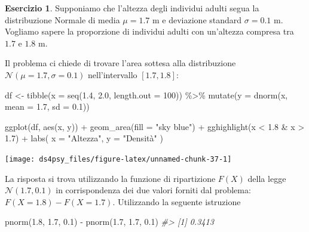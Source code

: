 \documentclass[
  11pt,
]{krantz}
\makeatletter
\newenvironment{Shaded}{\begin{snugshade}}{\end{snugshade}}
\newcommand{\AttributeTok}[1]{\textcolor[rgb]{0.61,0.61,0.61}{#1}}
\newcommand{\CommentTok}[1]{\textcolor[rgb]{0.37,0.37,0.37}{\textit{#1}}}
\newcommand{\DecValTok}[1]{\textcolor[rgb]{0.06,0.06,0.06}{#1}}
\newcommand{\FloatTok}[1]{\textcolor[rgb]{0.06,0.06,0.06}{#1}}
\newcommand{\FunctionTok}[1]{\textcolor[rgb]{0,0,0}{#1}}
\newcommand{\NormalTok}[1]{#1}
\newcommand{\OtherTok}[1]{\textcolor[rgb]{0.37,0.37,0.37}{#1}}
\newcommand{\SpecialCharTok}[1]{\textcolor[rgb]{0,0,0}{#1}}
\newcommand{\StringTok}[1]{\textcolor[rgb]{0.5,0.5,0.5}{#1}}
\newenvironment{kframe}{%
\medskip{}
\setlength{\fboxsep}{.8em}
 \def\at@end@of@kframe{}%
 \ifinner\ifhmode%
  \def\at@end@of@kframe{\end{minipage}}%
  \begin{minipage}{\columnwidth}%
 \fi\fi%
 \def\FrameCommand##1{\hskip\@totalleftmargin \hskip-\fboxsep
 \colorbox{shadecolor}{##1}\hskip-\fboxsep
     \hskip-\linewidth \hskip-\@totalleftmargin \hskip\columnwidth}%
 \MakeFramed {\advance\hsize-\width
   \@totalleftmargin\z@ \linewidth\hsize
   \@setminipage}}%
 {\par\unskip\endMakeFramed%
 \at@end@of@kframe}
\renewenvironment{Shaded}{\begin{kframe}}{\end{kframe}}
\theoremstyle{definition}
\theoremstyle{definition}
\theoremstyle{definition}
\newtheorem{exercise}{Esercizio}[chapter]
\theoremstyle{definition}
\theoremstyle{remark}
\makeatother
\begin{document}
\begin{exercise}
Supponiamo che l'altezza degli individui adulti segua la distribuzione Normale di media \(\mu = 1.7\) m e deviazione standard \(\sigma = 0.1\) m. Vogliamo sapere la proporzione di individui adulti con un'altezza compresa tra \(1.7\) e \(1.8\) m.

Il problema ci chiede di trovare l'area sottesa alla distribuzione \(\mathcal{N}(\mu = 1.7, \sigma = 0.1)\) nell'intervallo \([1.7, 1.8]\):

\begin{Shaded}
\begin{Highlighting}[]
\NormalTok{df }\OtherTok{\textless{}{-}} \FunctionTok{tibble}\NormalTok{(}\AttributeTok{x =} \FunctionTok{seq}\NormalTok{(}\FloatTok{1.4}\NormalTok{, }\FloatTok{2.0}\NormalTok{, }\AttributeTok{length.out =} \DecValTok{100}\NormalTok{)) }\SpecialCharTok{\%\textgreater{}\%}
  \FunctionTok{mutate}\NormalTok{(}\AttributeTok{y =} \FunctionTok{dnorm}\NormalTok{(x, }\AttributeTok{mean =} \FloatTok{1.7}\NormalTok{, }\AttributeTok{sd =} \FloatTok{0.1}\NormalTok{))}

\FunctionTok{ggplot}\NormalTok{(df, }\FunctionTok{aes}\NormalTok{(x, y)) }\SpecialCharTok{+}
  \FunctionTok{geom\_area}\NormalTok{(}\AttributeTok{fill =} \StringTok{"sky blue"}\NormalTok{) }\SpecialCharTok{+}
  \FunctionTok{gghighlight}\NormalTok{(x }\SpecialCharTok{\textless{}} \FloatTok{1.8} \SpecialCharTok{\&}\NormalTok{ x }\SpecialCharTok{\textgreater{}} \FloatTok{1.7}\NormalTok{) }\SpecialCharTok{+}
  \FunctionTok{labs}\NormalTok{(}
    \AttributeTok{x =} \StringTok{"Altezza"}\NormalTok{,}
    \AttributeTok{y =} \StringTok{"Densità"}
\NormalTok{  )}
\end{Highlighting}
\end{Shaded}

\begin{center}\texttt{[image: ds4psy\_files/figure-latex/unnamed-chunk-37-1]} \end{center}

\noindent La risposta si trova utilizzando la funzione di ripartizione \(F(X)\) della legge \(\mathcal{N}(1.7, 0.1)\) in corrispondenza dei due valori forniti dal problema: \(F(X = 1.8) - F(X = 1.7)\). Utilizzando la seguente istruzione

\begin{Shaded}
\begin{Highlighting}[]
\FunctionTok{pnorm}\NormalTok{(}\FloatTok{1.8}\NormalTok{, }\FloatTok{1.7}\NormalTok{, }\FloatTok{0.1}\NormalTok{) }\SpecialCharTok{{-}} \FunctionTok{pnorm}\NormalTok{(}\FloatTok{1.7}\NormalTok{, }\FloatTok{1.7}\NormalTok{, }\FloatTok{0.1}\NormalTok{)}
\CommentTok{\#\textgreater{} [1] 0.3413}
\end{Highlighting}
\end{Shaded}


\end{exercise}
\end{document}
